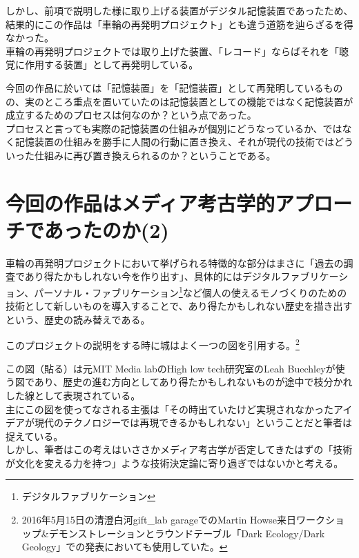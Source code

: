 しかし、前項で説明した様に取り上げる装置がデジタル記憶装置であったため、結果的にこの作品は「車輪の再発明プロジェクト」とも違う道筋を辿らざるを得なかった。\\
車輪の再発明プロジェクトでは取り上げた装置、「レコード」ならばそれを「聴覚に作用する装置」として再発明している。

今回の作品に於いては「記憶装置」を「記憶装置」として再発明しているものの、実のところ重点を置いていたのは記憶装置としての機能ではなく記憶装置が成立するためのプロセスは何なのか？という点であった。\\
プロセスと言っても実際の記憶装置の仕組みが個別にどうなっているか、ではなく記憶装置の仕組みを勝手に人間の行動に置き換え、それが現代の技術ではどういった仕組みに再び置き換えられるのか？ということである。

\section{今回の作品はメディア考古学的アプローチであったのか(2)}\label{ux4ecaux56deux306eux4f5cux54c1ux306fux30e1ux30c7ux30a3ux30a2ux8003ux53e4ux5b66ux7684ux30a2ux30d7ux30edux30fcux30c1ux3067ux3042ux3063ux305fux306eux304b2}

車輪の再発明プロジェクトにおいて挙げられる特徴的な部分はまさに「過去の調査であり得たかもしれない今を作り出す」、具体的にはデジタルファブリケーション、パーソナル・ファブリケーション\footnote{デジタルファブリケーション}など個人の使えるモノづくりのための技術として新しいものを導入することで、あり得たかもしれない歴史を描き出すという、歴史の読み替えである。

このプロジェクトの説明をする時に城はよく一つの図を引用する。\footnote{2016年5月15日の清澄白河gift\_lab
  garageでのMartin
  Howse来日ワークショップ\&デモンストレーションとラウンドテーブル「Dark
  Ecology/Dark Geology」での発表においても使用していた。}\\
\autocite{soundstudies3}

この図（貼る）は元MIT Media labのHigh low tech研究室のLeah
Buechleyが使う図であり、歴史の進む方向としてあり得たかもしれないものが途中で枝分かれした線として表現されている。\\
主にこの図を使ってなされる主張は「その時出ていたけど実現されなかったアイデアが現代のテクノロジーでは再現できるかもしれない」ということだと筆者は捉えている。\\
しかし、筆者はこの考えはいささかメディア考古学が否定してきたはずの「技術が文化を変える力を持つ」ような技術決定論に寄り過ぎではないかと考える。

